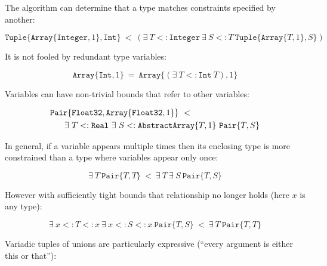 \noindent
The algorithm can determine that a type matches constraints specified by another:

\vspace{-5ex}
\[
\texttt{Tuple}\{\texttt{Array}\{\texttt{Integer},1\}, \texttt{Int}\}\ <\ 
  (\exists\ T<:\texttt{Integer}\ \exists\ S<:T\ \texttt{Tuple}\{\texttt{Array}\{T,1\},S\})
\]

\vspace{-1ex}
\noindent
It is not fooled by redundant type variables:

\vspace{-2ex}
\[
\texttt{Array}\{\texttt{Int},1\}\ =\ 
  \texttt{Array}\{(\exists\ T<:\texttt{Int}\ T), 1\} \]

\noindent
Variables can have non-trivial bounds that refer to other variables:

\vspace{-3ex}
\begin{singlespace}
\begin{align*}
&\texttt{Pair}\{\texttt{Float32},\texttt{Array}\{\texttt{Float32},1\}\}\ <\ \\
&\hspace{4ex}\exists\ T<:\texttt{Real}\ \exists\ S<:\texttt{AbstractArray}\{T,1\}\ \texttt{Pair}\{T,S\}
\end{align*}
\end{singlespace}


\noindent
In general, if a variable appears multiple times then its enclosing type is
more constrained than a type where variables appear only once:

\vspace{-3ex}
\[
\exists\ T\ \texttt{Pair}\{T,T\}\ <\ \exists\ T\ \exists\ S\ \texttt{Pair}\{T,S\}
\]

\noindent
However with sufficiently tight bounds that relationship no longer holds
(here $x$ is any type):

\vspace{-3ex}
\[
\exists\ x<:T<:x\ \exists\ x<:S<:x\ \texttt{Pair}\{T,S\}\ <\ \exists\ T\ \texttt{Pair}\{T,T\}
\]


\noindent
Variadic tuples of unions are particularly expressive (``every argument is
either this or that''):

